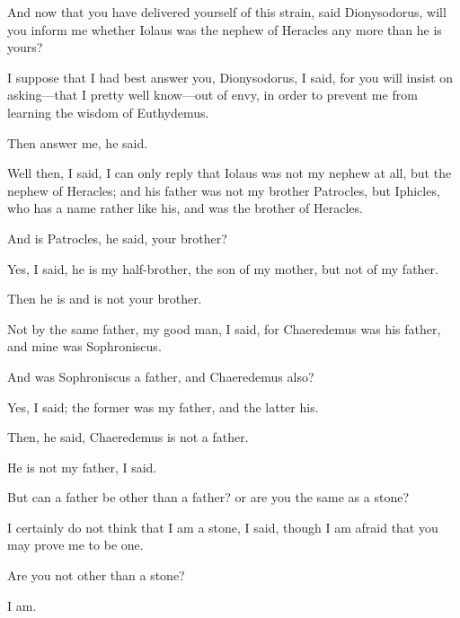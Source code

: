 \documentclass[11pt,letter]{article}
\begin{document}
\par  And now that you have delivered yourself of this strain, said Dionysodorus, will you inform me whether Iolaus was the nephew of Heracles any more than he is yours?

\par  I suppose that I had best answer you, Dionysodorus, I said, for you will insist on asking—that I pretty well know—out of envy, in order to prevent me from learning the wisdom of Euthydemus.

\par  Then answer me, he said.

\par  Well then, I said, I can only reply that Iolaus was not my nephew at all, but the nephew of Heracles; and his father was not my brother Patrocles, but Iphicles, who has a name rather like his, and was the brother of Heracles.

\par  And is Patrocles, he said, your brother?

\par  Yes, I said, he is my half-brother, the son of my mother, but not of my father.

\par  Then he is and is not your brother.

\par  Not by the same father, my good man, I said, for Chaeredemus was his father, and mine was Sophroniscus.

\par  And was Sophroniscus a father, and Chaeredemus also?

\par  Yes, I said; the former was my father, and the latter his.

\par  Then, he said, Chaeredemus is not a father.

\par  He is not my father, I said.

\par  But can a father be other than a father? or are you the same as a stone?

\par  I certainly do not think that I am a stone, I said, though I am afraid that you may prove me to be one.

\par  Are you not other than a stone?

\par  I am.
\end{document}
